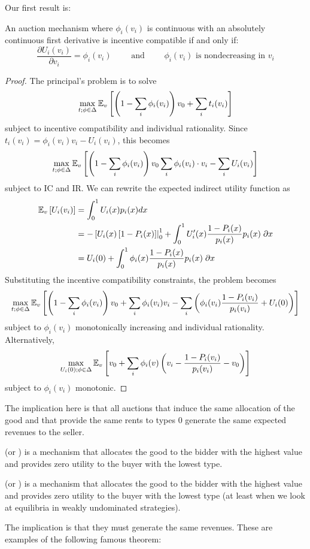 \documentclass[10pt]{article}
\begin{document}
Our first result is:
\begin{proposition}
	An auction mechanism where $\phi_i(v_i)$ is continuous with an absolutely continuous first derivative is incentive compatible if and only if:\[\frac{\partial U_i(v_i)}{\partial v_i} = \phi_i(v_i) \qquad \text{ and } \qquad \phi_i(v_i) \text{ is nondecreasing in } v_i\]
\end{proposition}
\begin{proof}
	The principal's problem is to solve \[\max_{t; \phi \in \Delta} \mathbb{E}_v \left[ \left( 1 - \sum_i \phi_i(v_i)\right) v_0 + \sum_i t_i(v_i)\right]\]subject to incentive compatibility and individual rationality. Since $t_i(v_i) = \phi_i(v_i)v_i - U_i(v_i)$, this becomes\[\max_{t;\phi\in\Delta} \mathbb{E}_v \left[ \left( 1 - \sum_i \phi_i(v_i)\right) v_0 \sum_i \phi_i(v_i)\cdot v_i - \sum_i U_i(v_i)\right]\]subject to IC and IR. We can rewrite the expected indirect utility function as \begin{align*} \mathbb{E}_v \left[ U_i(v_i)\right] &= \int_0^1 U_i(x)p_i(x)dx \\ &= - \left[ U_i(x)\left[ 1 - P_i(x)\right] \right|_0^1 + \int_0^1 U_i'(x) \frac{1-P_i(x)}{p_i(x)}p_i(x)\;\partial x\\ &= U_i(0) + \int_0^1 \phi_i(x) \frac{1-P_i(x)}{p_i(x)}p_i(x)\;\partial x\end{align*}Substituting the incentive compatibility constraints, the problem becomes\[\max_{t;\phi\in\Delta} \mathbb{E}_v \left[ \left( 1 - \sum_i \phi_i(v_i)\right) v_0 + \sum_i \phi_i(v_i)v_i - \sum_i \left( \phi_i(v_i) \frac{1-P_i(v_i)}{p_i(v_i)} + U_i(0)\right)\right]\]subject to $\phi_i(v_i)$ monotonically increasing and individual rationality. Alternatively,\[\max_{U_i(0);\phi\in\Delta} \mathbb{E}_v \left[ v_0 + \sum_i \phi_i(v) \left( v_i - \frac{1-P_i(v_i)}{p_i(v_i)} - v_0\right)\right]\]subject to $\phi_i(v_i)$ monotonic. 
\end{proof}



\begin{remark}
	The implication here is that all auctions that induce the same allocation of the good and that provide the same rents to types 0 generate the same expected revenues to the seller. 
\end{remark}

\begin{remark}
	 (or ) is a mechanism that allocates the good to the bidder with the highest value and provides zero utility to the buyer with the lowest type.
	
	 (or ) is a mechanism that allocates the good to the bidder with the highest value and provides zero utility to the buyer with the lowest type (at least when we look at equilibria in weakly undominated strategies).
	
	The implication is that they must generate the same revenues. These are examples of the following famous theorem:
\end{remark}
\end{document}
